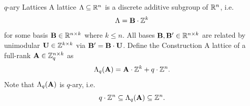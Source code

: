 \documentclass[xcolor=table,10pt,aspectratio=169]{beamer}
\begin{document}
\begin{frame}
{
  }
\end{frame}

\begin{frame}{$q$-ary Lattices}
  A lattice \(\Lambda \subseteq \mathbb{R}^n\) is a discrete additive subgroup of \(\mathbb{R}^n\), i.e. 
      \[
        \Lambda = \mathbf{B} \cdot \mathbb{Z}^{k}
      \]
      for some basis \(\mathbf{B} \in \mathbb{R}^{n \times k}\) where \(k \leq n\). All bases \(\mathbf{B}, \mathbf{B}' \in \mathbb{R}^{n \times k}\) are related by unimodular \(\mathbf{U} \in \mathbb{Z}^{k \times k}\) via \(\mathbf{B}' = \mathbf{B} \cdot \mathbf{U}\). 
  \vfill
  Define the Construction A lattice of a full-rank \(\mathbf{A} \in \mathbb{Z}_q^{n \times k}\) as
  \[
    \Lambda_q(\mathbf{A}) = \mathbf{A} \cdot \mathbb{Z}^k + q \cdot \mathbb{Z}^n.
  \] 
  \vfill
  Note that \(\Lambda_q(\mathbf{A})\) is \(q\)-ary, i.e. 
  \[
    q \cdot \mathbb{Z}^n \subseteq \Lambda_q(\mathbf{A}) \subseteq \mathbb{Z}^n.
  \]
\end{frame}
\end{document}
